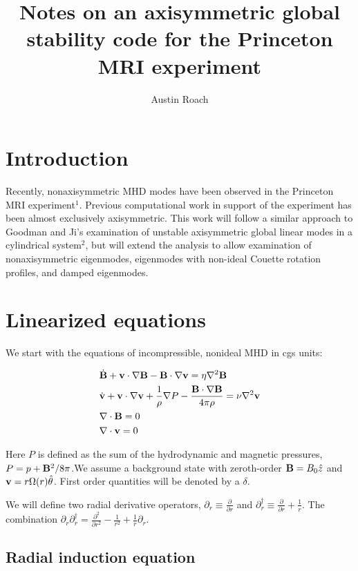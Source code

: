 \documentclass[letterpaper]{article}
\title{Notes on an axisymmetric global stability code for the Princeton MRI experiment}
\author{Austin Roach}
\begin{document}
\maketitle{}

\section{Introduction}

Recently, nonaxisymmetric MHD modes have been observed in the
Princeton MRI experiment$^1$.  Previous computational work in support
of the experiment has been almost exclusively axisymmetric.  This work
will follow a similar approach to Goodman and Ji's examination of
unstable axisymmetric global linear modes in a cylindrical system$^2$,
but will extend the analysis to allow examination of nonaxisymmetric
eigenmodes, eigenmodes with non-ideal Couette rotation profiles, and
damped eigenmodes.

\section{Linearized equations}

We start with the equations of incompressible, nonideal MHD in cgs units:

\begin{align}
&\dot{{\bf B}} + {\bf v}\cdot\nabla{\bf B} - {\bf B}\cdot\nabla{\bf v}=\eta\nabla^2 {\bf B}
\\
&\dot{{\bf v}}+{\bf v}\cdot\nabla{\bf v}+\frac{1}{\rho}\nabla{P}-\frac{{\bf B}\cdot\nabla{\bf B}}{4\pi\rho}=\nu\nabla^2{\bf v}
\\
&\nabla\cdot{\bf B}=0
\\
&\nabla\cdot{\bf v}=0
\end{align}

Here $P$ is defined as the sum of the hydrodynamic and magnetic
pressures, $P=p+{\bf B}^2/8\pi$.We assume a background state with
zeroth-order ${\bf B}=B_0 \hat{z}$ and ${\bf
  v}=r\Omega(r)\hat{\theta}$.  First order quantities will be denoted
by a $\delta$.

We will define two radial derivative operators, $\partial_r \equiv
\frac{\partial}{\partial r}$ and $\partial_{r}^\dagger \equiv
\frac{\partial}{\partial r}+\frac{1}{r}$.  The combination
$\partial_r \partial_r^\dagger = \frac{\partial^2}{\partial
  r^2}-\frac{1}{r^2}+\frac{1}{r}\partial_r$.

\subsection{Radial induction equation}
\end{document}

